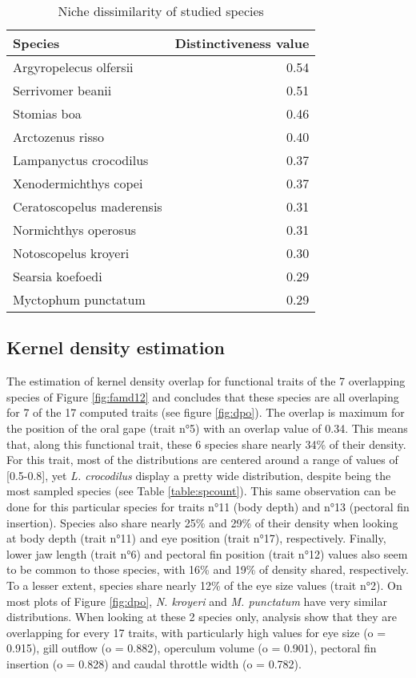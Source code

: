 \begin{table}[ht]
\centering
\caption{Niche dissimilarity of studied species}
\label{table:nich_diss}
\begin{adjustbox}{max width=1.1\textwidth,center}
\begin{tabular}{lr}
  \hline
Species & Distinctiveness value \\ 
  \hline
Argyropelecus olfersii & 0.54 \\ 
  Serrivomer beanii & 0.51 \\ 
  Stomias boa & 0.46 \\ 
  Arctozenus risso & 0.40 \\ 
  Lampanyctus crocodilus & 0.37 \\ 
  Xenodermichthys copei & 0.37 \\ 
  Ceratoscopelus maderensis & 0.31 \\ 
  Normichthys operosus & 0.31 \\ 
  Notoscopelus kroyeri & 0.30 \\ 
  Searsia koefoedi & 0.29 \\ 
  Myctophum punctatum & 0.29 \\  
   \hline
\end{tabular}
\end{adjustbox}
\end{table}


\subsection{Kernel density estimation}
The estimation of kernel density overlap for functional traits of the 7 overlapping species of Figure \ref{fig:famd12} and concludes that these species are all overlaping for 7 of the 17 computed traits (see figure \ref{fig:dpo}). The overlap is maximum for the position of the oral gape (trait n°5) with an overlap value of 0.34. This means that, along this functional trait, these 6 species share nearly 34\% of their density. For this trait, most of the distributions are centered around a range of values of [0.5-0.8], yet \textit{L. crocodilus} display a pretty wide distribution, despite being the most sampled species (see Table \ref{table:spcount}). This same observation can be done for this particular species for traits n°11 (body depth) and n°13 (pectoral fin insertion). Species also share nearly 25\% and 29\% of their density when looking at body depth (trait n°11) and eye position (trait n°17), respectively. Finally, lower jaw length (trait n°6) and pectoral fin position (trait n°12) values also seem to be common to those species, with 16\% and 19\% of density shared, respectively. To a lesser extent, species share nearly 12\% of the eye size values (trait n°2).
On most plots of Figure \ref{fig:dpo}, \textit{N. kroyeri} and \textit{M. punctatum} have very similar distributions. When looking at these 2 species only, analysis show that they are overlapping for every 17 traits, with particularly high values for eye size (o = 0.915), gill outflow (o = 0.882), operculum volume (o = 0.901), pectoral fin insertion (o = 0.828) and caudal throttle width (o = 0.782). 


